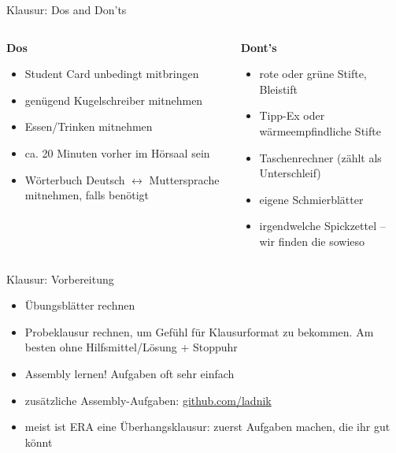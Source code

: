 \documentclass[
  german,            %
  aspectratio=169,    %
]{tumbeamer}
\newcommand{\cmark}{\ding{51}}%
\newcommand{\xmark}{\ding{55}}%
\begin{document}
\begin{frame}[c]{Klausur: Dos and Don'ts}{}
	\begin{columns}[c]
		\begin{column}{0.5\textwidth}
			\centering \textbf{Dos} \textcolor{green}{\cmark}
			\vspace{\baselineskip}
			\begin{itemize}
				\item Student Card unbedingt mitbringen
				\item genügend Kugelschreiber mitnehmen
				\item Essen/Trinken mitnehmen
				\item ca. 20 Minuten vorher im Hörsaal sein
				\item Wörterbuch Deutsch $\leftrightarrow$ Muttersprache mitnehmen, falls benötigt
			\end{itemize}
		\end{column}
		\begin{column}{0.5\textwidth}
			\centering \textbf{Dont's} \textcolor{red}{\xmark}
			\vspace{\baselineskip}
			\begin{itemize}
				\item rote oder grüne Stifte, Bleistift
				\item Tipp-Ex oder wärmeempfindliche Stifte
				\item Taschenrechner (zählt als Unterschleif)
				\item eigene Schmierblätter
				\item irgendwelche Spickzettel -- wir finden die sowieso
			\end{itemize}
		\end{column}
	\end{columns}
\end{frame}

\begin{frame}[c]{Klausur: Vorbereitung}{}
	\begin{itemize}
		\item Übungsblätter rechnen
		\item Probeklausur rechnen, um Gefühl für Klausurformat zu bekommen. Am besten ohne Hilfsmittel/Lösung + Stoppuhr
		\item Assembly lernen! Aufgaben oft sehr einfach
		\item zusätzliche Assembly-Aufgaben: \href{https://github.com/ladnik/RISC-V-Assembly-Introductory-Exercises}{github.com/ladnik}
		\item meist ist ERA eine Überhangsklausur: zuerst Aufgaben machen, die ihr gut könnt
	\end{itemize}
\end{frame}
\end{document}
